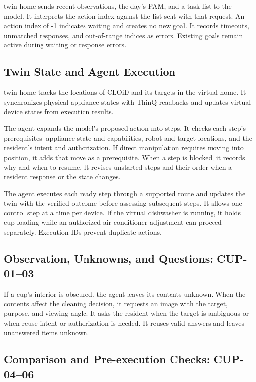 \documentclass[conference,a4paper]{IEEEtran}
\begin{document}
twin-home sends recent observations, the day's PAM, and a task list to the model. It interprets the action index against the list sent with that request. An action index of -1 indicates waiting and creates no new goal. It records timeouts, unmatched responses, and out-of-range indices as errors. Existing goals remain active during waiting or response errors.~\cite{pam}

\subsection{Twin State and Agent Execution}

twin-home tracks the locations of CLOiD and its targets in the virtual home. It synchronizes physical appliance states with ThinQ readbacks and updates virtual device states from execution results.

The agent expands the model's proposed action into steps. It checks each step's prerequisites, appliance state and capabilities, robot and target locations, and the resident's intent and authorization. If direct manipulation requires moving into position, it adds that move as a prerequisite. When a step is blocked, it records why and when to resume. It revises unstarted steps and their order when a resident response or the state changes.~\cite{schedule}

The agent executes each ready step through a supported route and updates the twin with the verified outcome before assessing subsequent steps. It allows one control step at a time per device. If the virtual dishwasher is running, it holds cup loading while an authorized air-conditioner adjustment can proceed separately. Execution IDs prevent duplicate actions.

\subsection{Observation, Unknowns, and Questions: CUP-01--03}

If a cup's interior is obscured, the agent leaves its contents unknown. When the contents affect the cleaning decision, it requests an image with the target, purpose, and viewing angle. It asks the resident when the target is ambiguous or when reuse intent or authorization is needed. It reuses valid answers and leaves unanswered items unknown.

\subsection{Comparison and Pre-execution Checks: CUP-04--06}
\end{document}
